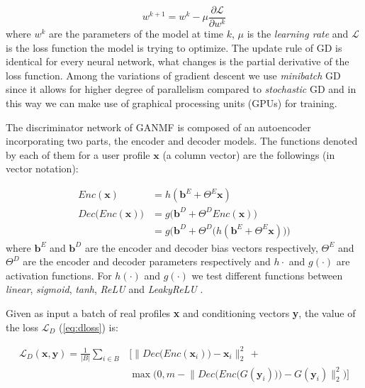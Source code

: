 \begin{equation}
    w^{k+1} = w^{k} - \mu \frac{\partial\mathcal{L}}{\partial w^{k}}
\end{equation}
where $w^{k}$ are the parameters of the model at time $k$, $\mu$ is the \emph{learning rate} and $\mathcal{L}$ is the loss function the model is trying to optimize. The update rule of GD is identical for every neural network, what changes is the partial derivative of the loss function. Among the variations of gradient descent we use \emph{minibatch} GD since it allows for higher degree of parallelism compared to \emph{stochastic} GD and in this way we can make use of graphical processing units (GPUs) for training. 

The discriminator network of GANMF is composed of an autoencoder incorporating two parts, the encoder and decoder models. The functions denoted by each of them for a user profile $\mathbf{x}$ (a column vector) are the followings (in vector notation):

\[
\begin{split}
    Enc(\mathbf{x}) & = h(\mathbf{b}^{E} + \Theta^{E} \mathbf{x}) \\
    Dec\big(Enc(\mathbf{x})\big) & = g\big(\mathbf{b}^{D} + \Theta^{D}Enc(\mathbf{x})\big) \\
    & = g\Big(\mathbf{b}^{D} + \Theta^{D}\big(h(\mathbf{b}^{E} + \Theta^{E} \mathbf{x})\big)\Big)
\end{split}
\]
where $\mathbf{b}^{E}$ and $\mathbf{b}^{D}$ are the encoder and decoder bias vectors respectively, $\Theta^{E}$ and $\Theta^{D}$ are the encoder and decoder parameters respectively and $h\cdot$ and $g(\cdot)$ are activation functions. For $h(\cdot)$ and $g(\cdot)$ we test different functions between \emph{linear}, \emph{sigmoid}, \emph{tanh}, \emph{ReLU} \cite{glorot2011deep} and \emph{LeakyReLU} \cite{maas2013rectifier}.

Given as input a batch of real profiles \textbf{x} and conditioning vectors \textbf{y}, the value of the loss $\mathcal{L}_{D}$ (\ref{eq:dloss}) is:

\[
    \begin{split}
        \mathcal{L}_{D}(\mathbf{x}, \mathbf{y}) = \frac{1}{|B|} \sum_{i \in B}
        & \Bigg[ \Big\|Dec\big(Enc(\mathbf{x}_{i})\big) - \mathbf{x}_{i}\Big\|^{2}_{2} \, + \\
        & \max \Bigg(0, m - \bigg\|Dec\Big(Enc\big(G(\mathbf{y}_{i})\big)\Big) - G(\mathbf{y}_{i})\bigg\|^{2}_{2}\Bigg) \Bigg]
    \end{split}
\]

